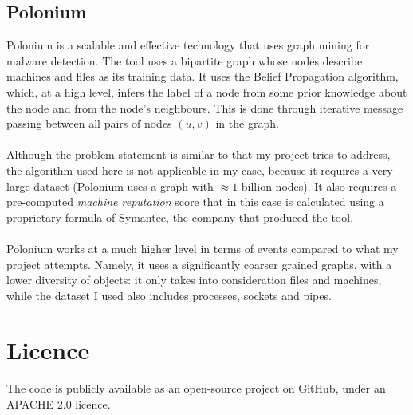 	\subsection{Polonium}
	Polonium is a scalable and effective technology that uses graph mining for malware detection. The tool uses a bipartite graph whose nodes describe machines and files as its training data. It uses the Belief Propagation algorithm, which, at a high level, infers the label of a node from some prior knowledge about the node and from the node's neighbours. This is done through iterative message passing between all pairs of nodes $(u, v)$ in the graph. 
	\\ \\
	Although the problem statement is similar to that my project tries to address, the algorithm used here is not applicable in my case, because it requires a very large dataset (Polonium uses a graph with $\approx 1$ billion nodes). It also requires a pre-computed \textit{machine reputation} score that in this case is calculated using a proprietary formula of Symantec\footnotemark[2], the company that produced the tool. 
	\\ \\
	Polonium works at a much higher level in terms of events compared to what my project attempts. Namely, it uses a significantly coarser grained graphs, with a lower diversity of objects: it only takes into consideration files and machines, while the dataset I used also includes processes, sockets and pipes. 

	
	\section{Licence} 
	The code is publicly available as an open-source project on GitHub\footnotemark[3], under an APACHE 2.0 licence\footnotemark[4]. 
	
	
